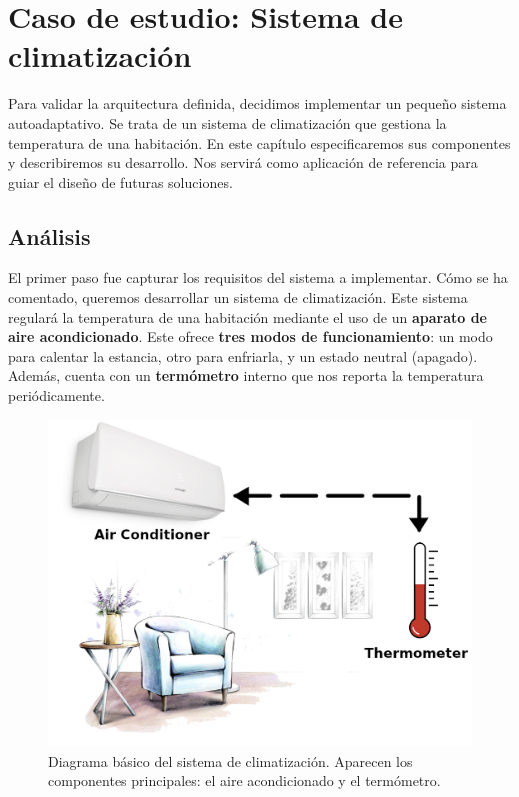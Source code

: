 \chapter{Caso de estudio: Sistema de climatización}
\label{chap:caso_estudio}

Para validar la arquitectura definida, decidimos implementar un pequeño sistema autoadaptativo. Se trata de un sistema de climatización que gestiona la temperatura de una habitación. En este capítulo especificaremos sus componentes y describiremos su desarrollo. Nos servirá como aplicación de referencia para guiar el diseño de futuras soluciones.

\section{Análisis}

El primer paso fue capturar los requisitos del sistema a implementar. Cómo se ha comentado, queremos desarrollar un sistema de climatización. Este sistema regulará la temperatura de una habitación mediante el uso de un \textbf{aparato de aire acondicionado}. Este ofrece \textbf{tres modos de funcionamiento}: un modo para calentar la estancia, otro para enfriarla, y un estado neutral (apagado). Además, cuenta con un \textbf{termómetro} interno que nos reporta la temperatura periódicamente.

\begin{figure}[h!]
  \centering
  \includegraphics[scale=0.23]{cap_caso-estudio/images/aire-acondicionado}
  \caption[Diagrama básico del sistema de climatización. Aparecen los componentes principales: el aire acondicionado y el termómetro.]{Diagrama básico del sistema de climatización. Aparecen los componentes principales: el aire acondicionado y el termómetro. \footnotemark}
  \label{fig:caso-estudio-diagrama}
\end{figure}

